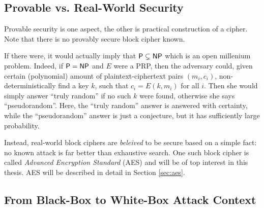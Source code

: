 
\subsection{Provable vs. Real-World Security}
\label{sec:provable}

Provable security is one aspect, the other is practical construction of a cipher. Note that there is no provably secure block cipher known.

If there were, it would actually imply that $\mathsf{P} \subsetneq \mathsf{NP}$ which is an open millenium problem. Indeed, if $\mathsf{P} = \mathsf{NP}$ and $E$ were a PRP, then the adversary could, given certain (polynomial) amount of plaintext-ciphertext pairs $(m_i,c_i)$, non-deterministically find a key $k$, such that $c_i = E(k,m_i)$ for all $i$. Then she would simply answer ``truly random'' if no such $k$ were found, otherwise she says ``pseudorandom''. Here, the ``truly random'' answer is answered with certainty, while the ``pseudorandom'' answer is just a conjecture, but it has sufficiently large probability.

Instead, real-world block ciphers are {\em beleived} to be secure based on a simple fact: no known attack is far better than exhaustive search. One such block cipher is called {\em Advanced Encryption Standard} (AES) and will be of top interest in this thesis. AES will be described in detail in Section \ref{sec:aes}.



\subsection{From Black-Box to White-Box Attack Context}
\label{sec:bbtowb}

